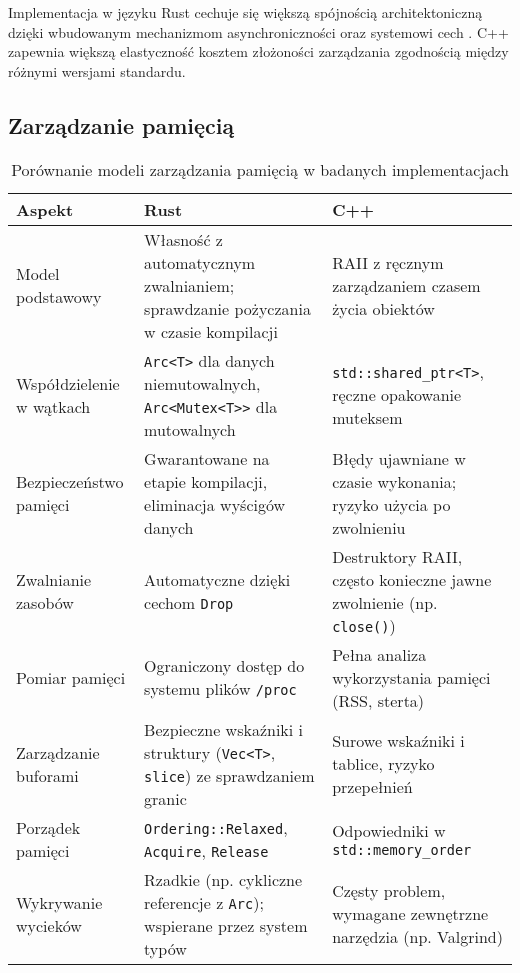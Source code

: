 Implementacja w języku Rust cechuje się większą spójnością architektoniczną dzięki wbudowanym mechanizmom asynchroniczności oraz systemowi cech . C++ zapewnia większą elastyczność kosztem złożoności zarządzania zgodnością między różnymi wersjami standardu.


\subsection{Zarządzanie pamięcią}

\begin{table}[H]
    \centering
    \caption{Porównanie modeli zarządzania pamięcią w badanych implementacjach}
    \renewcommand{\arraystretch}{1.3}
    \begin{tabularx}{\textwidth}{lX X}
        \toprule
        \textbf{Aspekt} &
        \textbf{Rust} &
        \textbf{C++} \\
        \midrule
        Model podstawowy &
        Własność z automatycznym zwalnianiem; sprawdzanie pożyczania w czasie kompilacji &
        RAII z ręcznym zarządzaniem czasem życia obiektów \\
        \midrule
        Współdzielenie w wątkach &
        \texttt{Arc<T>} dla danych niemutowalnych, \texttt{Arc<Mutex<T>>} dla mutowalnych &
        \texttt{std::shared\_ptr<T>}, ręczne opakowanie muteksem \\
        \midrule
        Bezpieczeństwo pamięci &
        Gwarantowane na etapie kompilacji, eliminacja wyścigów danych &
        Błędy ujawniane w czasie wykonania; ryzyko użycia po zwolnieniu \\
        \midrule
        Zwalnianie zasobów &
        Automatyczne dzięki cechom \texttt{Drop} &
        Destruktory RAII, często konieczne jawne zwolnienie (np. \texttt{close()}) \\
        \midrule
        Pomiar pamięci &
        Ograniczony dostęp do systemu plików \texttt{/proc} &
        Pełna analiza wykorzystania pamięci (RSS, sterta) \\
        \midrule
        Zarządzanie buforami &
        Bezpieczne wskaźniki i struktury (\texttt{Vec<T>}, \texttt{slice}) ze sprawdzaniem granic &
        Surowe wskaźniki i tablice, ryzyko przepełnień \\
        \midrule
        Porządek pamięci &
        \texttt{Ordering::Relaxed}, \texttt{Acquire}, \texttt{Release} &
        Odpowiedniki w \texttt{std::memory\_order} \\
        \midrule
        Wykrywanie wycieków &
        Rzadkie (np. cykliczne referencje z \texttt{Arc}); wspierane przez system typów &
        Częsty problem, wymagane zewnętrzne narzędzia (np. Valgrind) \\
        \bottomrule
    \end{tabularx}
\end{table}



